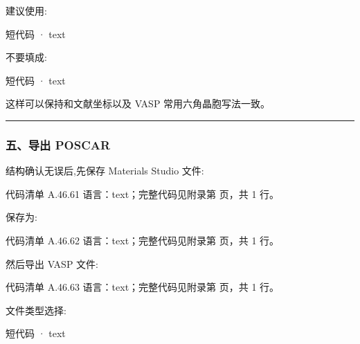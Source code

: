 \documentclass[lang=cn,scheme=chinese,color=blue,device=normal,toc=onecol,math=cm]{elegantbook}
\begin{document}
建议使用:\par


\begin{inlinecodebox}{短代码 · text}
\end{inlinecodebox}


不要填成:\par


\begin{inlinecodebox}{短代码 · text}
\end{inlinecodebox}


这样可以保持和文献坐标以及 VASP 常用六角晶胞写法一致。\par


\medskip\hrule\medskip


\subsubsection{五、导出 POSCAR}


结构确认无误后,先保存 Materials Studio 文件:\par


\begin{codeindexbox}{代码清单 A.46.61}
语言：text；完整代码见附录第 \pageref{code:46:61} 页，共 1 行。
\end{codeindexbox}


保存为:\par


\begin{codeindexbox}{代码清单 A.46.62}
语言：text；完整代码见附录第 \pageref{code:46:62} 页，共 1 行。
\end{codeindexbox}


然后导出 VASP 文件:\par


\begin{codeindexbox}{代码清单 A.46.63}
语言：text；完整代码见附录第 \pageref{code:46:63} 页，共 1 行。
\end{codeindexbox}


文件类型选择:\par


\begin{inlinecodebox}{短代码 · text}
\end{inlinecodebox}
\end{document}
